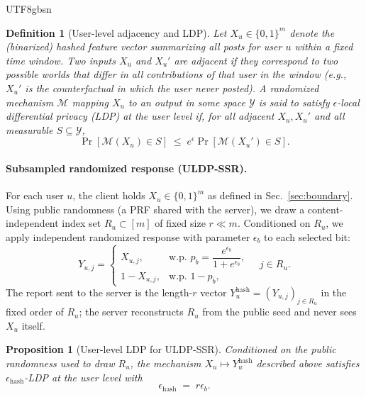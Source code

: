 \documentclass[lettersize,journal]{IEEEtran}
\newtheorem{definition}{Definition}
\newtheorem{proposition}{Proposition}
\begin{document}
\begin{CJK*}{UTF8}{gbsn}
\begin{definition}[User-level adjacency and LDP]
\label{def:uldp}
Let $X_u \in \{0,1\}^m$ denote the (binarized) hashed feature vector summarizing all posts for user $u$ within a fixed time window. Two inputs $X_u$ and $X_u'$ are adjacent if they correspond to two possible worlds that differ in all contributions of that user in the window (e.g., $X_u'$ is the counterfactual in which the user never posted). A randomized mechanism $\mathcal{M}$ mapping $X_u$ to an output in some space $\mathcal{Y}$ is said to satisfy $\epsilon$-local differential privacy (LDP) at the user level if, for all adjacent $X_u,X_u'$ and all measurable $S \subseteq \mathcal{Y}$,
\begin{equation}
  \Pr[\mathcal{M}(X_u) \in S]
  \;\le\; e^\epsilon \Pr[\mathcal{M}(X_u') \in S].
\end{equation}
\end{definition}

\paragraph{Subsampled randomized response (ULDP-SSR).}
For each user $u$, the client holds $X_u \in \{0,1\}^m$ as defined in Sec.~\ref{sec:boundary}. Using public randomness (a PRF shared with the server), we draw a content-independent index set $R_u \subset [m]$ of fixed size $r \ll m$. Conditioned on $R_u$, we apply independent randomized response with parameter $\epsilon_b$ to each selected bit:
\begin{equation}
  Y_{u,j} =
  \begin{cases}
    X_{u,j}, & \text{w.p. } p_b = \dfrac{e^{\epsilon_b}}{1+e^{\epsilon_b}},\\[0.6ex]
    1 - X_{u,j}, & \text{w.p. } 1-p_b,
  \end{cases}
  \quad j \in R_u.
\end{equation}
The report sent to the server is the length-$r$ vector
$Y^{\text{hash}}_u = (Y_{u,j})_{j \in R_u}$ in the fixed order of $R_u$; the server reconstructs $R_u$ from the public seed and never sees $X_u$ itself.

\begin{proposition}[User-level LDP for ULDP-SSR]
\label{prop:uldp-ssr}
Conditioned on the public randomness used to draw $R_u$, the mechanism $X_u \mapsto Y^{\text{hash}}_u$ described above satisfies $\epsilon_{\text{hash}}$-LDP at the user level with
\begin{equation}
  \epsilon_{\text{hash}} \;=\; r \epsilon_b.
\end{equation}
\end{proposition}


\end{CJK*}
\end{document}

